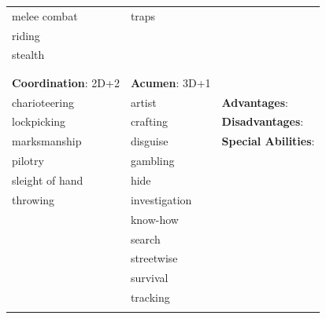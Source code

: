 \documentclass[10pt]{article}
\begin{document}
\begin{table}
\begin{tabular}{m{156pt} m{156pt} m{156pt}}
melee combat         \hrulefill & traps                \hrulefill & \\

riding               \hrulefill &  \hrulefill & \\

stealth              \hrulefill &  \hrulefill & \\

 \hrulefill &  \hrulefill & \\

 \hrulefill &  \hrulefill & \\


\textbf{Coordination}: 2D+2 \hrulefill & \textbf{Acumen}: 3D+1 \hrulefill     & \hrulefill \\

charioteering        \hrulefill & artist               \hrulefill & \textbf{Advantages}: \hrulefill \\

lockpicking          \hrulefill & crafting             \hrulefill & \textbf{Disadvantages}: \hrulefill \\

marksmanship         \hrulefill & disguise             \hrulefill & \textbf{Special Abilities}: \hrulefill \\

pilotry              \hrulefill & gambling             \hrulefill &  \hrulefill \\

sleight of hand      \hrulefill & hide                 \hrulefill &  \hrulefill \\

throwing             \hrulefill & investigation        \hrulefill &  \hrulefill \\

 \hrulefill & know-how             \hrulefill &  \hrulefill \\

 \hrulefill & search               \hrulefill &  \hrulefill \\

 \hrulefill & streetwise           \hrulefill &  \hrulefill \\

 \hrulefill & survival             \hrulefill &  \hrulefill \\

 \hrulefill & tracking             \hrulefill &  \hrulefill \\

 \hrulefill &  \hrulefill &  \hrulefill \\


\end{tabular}
\end{table}
\end{document}
